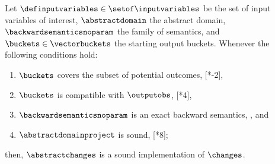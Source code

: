 \begin{lemma}
  Let $\definputvariables\in\setof\inputvariables$ be the set of input variables of interest, $\abstractdomain$ the abstract domain, $\backwardsemanticsnoparam$ the family of semantics, and $\buckets\in\vectorbuckets$ the starting output buckets.
  Whenever the following conditions hold:
  \begin{enumerate}[label=(\roman*)]
    \item \label{tio1} $\buckets$ covers the subset of potential outcomes, \cf{} [*-2],
    \item \label{tio2} $\buckets$ is compatible with $\outputobs$, \cf{} [*4],
    \item \label{tio3} $\backwardsemanticsnoparam$ is an exact backward semantics, \cf{} , and
    \item \label{tio4} $\abstractdomainproject$ is sound, \cf{} [*8];
  \end{enumerate}
  then, $\abstractchanges$ is a sound implementation of $\changes$.
\end{lemma}
